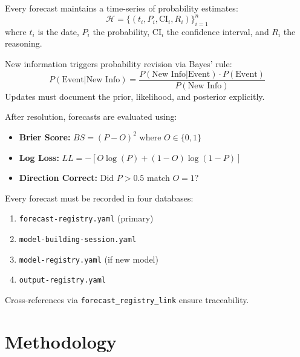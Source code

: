 \begin{axiom}
\label{ax:fct-2}
Every forecast maintains a time-series of probability estimates:
\[
\mathcal{H} = \{(t_i, P_i, \text{CI}_i, R_i)\}_{i=1}^{n}
\]
where $t_i$ is the date, $P_i$ the probability, $\text{CI}_i$ the confidence interval, and $R_i$ the reasoning.
\end{axiom}

\begin{axiom}
\label{ax:fct-3}
New information triggers probability revision via Bayes' rule:
\[
P(\text{Event}|\text{New Info}) = \frac{P(\text{New Info}|\text{Event}) \cdot P(\text{Event})}{P(\text{New Info})}
\]
Updates must document the prior, likelihood, and posterior explicitly.
\end{axiom}

\begin{axiom}
\label{ax:fct-4}
After resolution, forecasts are evaluated using:
\begin{itemize}
    \item \textbf{Brier Score:} $BS = (P - O)^2$ where $O \in \{0, 1\}$
    \item \textbf{Log Loss:} $LL = -[O \log(P) + (1-O) \log(1-P)]$
    \item \textbf{Direction Correct:} Did $P > 0.5$ match $O = 1$?
\end{itemize}
\end{axiom}

\begin{axiom}
\label{ax:fct-5}
Every forecast must be recorded in four databases:
\begin{enumerate}
    \item \texttt{forecast-registry.yaml} (primary)
    \item \texttt{model-building-session.yaml}
    \item \texttt{model-registry.yaml} (if new model)
    \item \texttt{output-registry.yaml}
\end{enumerate}
Cross-references via \texttt{forecast\_registry\_link} ensure traceability.
\end{axiom}

\section{Methodology}
\label{sec:fct-methodology}

